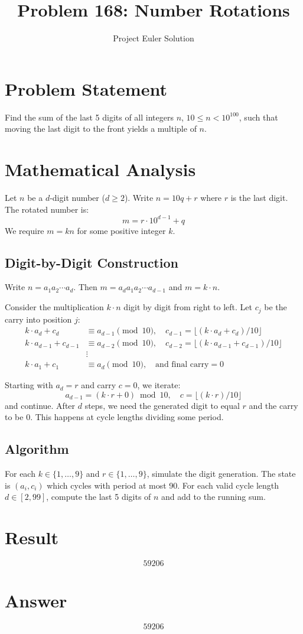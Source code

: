 \documentclass[11pt]{article}
\title{Problem 168: Number Rotations}
\author{Project Euler Solution}
\date{}
\begin{document}
\maketitle

\section{Problem Statement}
Find the sum of the last 5 digits of all integers $n$, $10 \le n < 10^{100}$, such that moving the last digit to the front yields a multiple of $n$.

\section{Mathematical Analysis}

Let $n$ be a $d$-digit number ($d \ge 2$). Write $n = 10q + r$ where $r$ is the last digit. The rotated number is:
\[
m = r \cdot 10^{d-1} + q
\]
We require $m = kn$ for some positive integer $k$.

\subsection{Digit-by-Digit Construction}
Write $n = a_1 a_2 \cdots a_d$. Then $m = a_d a_1 a_2 \cdots a_{d-1}$ and $m = k \cdot n$.

Consider the multiplication $k \cdot n$ digit by digit from right to left. Let $c_j$ be the carry into position $j$:
\begin{align}
k \cdot a_d + c_d &\equiv a_{d-1} \pmod{10}, \quad c_{d-1} = \lfloor (k \cdot a_d + c_d)/10 \rfloor \\
k \cdot a_{d-1} + c_{d-1} &\equiv a_{d-2} \pmod{10}, \quad c_{d-2} = \lfloor (k \cdot a_{d-1} + c_{d-1})/10 \rfloor \\
&\vdots \\
k \cdot a_1 + c_1 &\equiv a_d \pmod{10}, \quad \text{and final carry} = 0
\end{align}

Starting with $a_d = r$ and carry $c = 0$, we iterate:
\[
a_{d-1} = (k \cdot r + 0) \bmod 10, \quad c = \lfloor (k \cdot r)/10 \rfloor
\]
and continue. After $d$ steps, we need the generated digit to equal $r$ and the carry to be 0. This happens at cycle lengths dividing some period.

\subsection{Algorithm}
For each $k \in \{1,\ldots,9\}$ and $r \in \{1,\ldots,9\}$, simulate the digit generation. The state is $(a_i, c_i)$ which cycles with period at most 90. For each valid cycle length $d \in [2, 99]$, compute the last 5 digits of $n$ and add to the running sum.

\section{Result}
\[
\boxed{59206}
\]

\section{Answer}

\[
\boxed{59206}
\]
\end{document}
